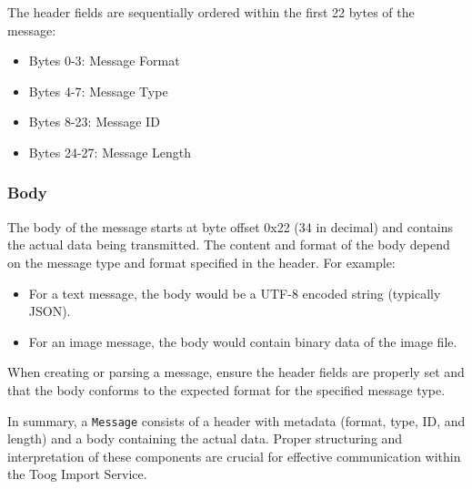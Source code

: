 \documentclass{memoir}
\begin{document}
	The header fields are sequentially ordered within the first 22 bytes of the message:
	\begin{itemize}
		\item Bytes 0-3: Message Format
		\item Bytes 4-7: Message Type
		\item Bytes 8-23: Message ID
		\item Bytes 24-27: Message Length
	\end{itemize}
	
	\subsubsection{Body}
	The body of the message starts at byte offset 0x22 (34 in decimal) and contains the actual data being transmitted. The content and format of the body depend on the message type and format specified in the header. For example:
	\begin{itemize}
		\item For a text message, the body would be a UTF-8 encoded string (typically JSON).
		\item For an image message, the body would contain binary data of the image file.
	\end{itemize}
	
	When creating or parsing a message, ensure the header fields are properly set and that the body conforms to the expected format for the specified message type.
	
	In summary, a \texttt{Message} consists of a header with metadata (format, type, ID, and length) and a body containing the actual data. Proper structuring and interpretation of these components are crucial for effective communication within the Toog Import Service.
	
\end{document}
